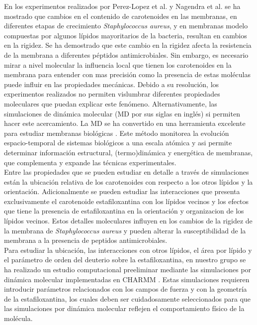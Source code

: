 En los experimentos realizados por Perez-Lopez et al. \cite{Perez-Lopez2019VariationsProperties} y Nagendra et al.  \cite{Nagendra2011} se ha mostrado que cambios en el contenido de carotenoides en las membranas, en diferentes etapas de crecimiento \textit{Staphylococcus aureus}, y en membranas modelo compuestas por algunos l\'{i}pidos mayoritarios de la bacteria, resultan en cambios en la rigidez. Se ha demostrado que este cambio en la rigidez afecta la resistencia de la membrana a diferentes p\'{e}ptidos antimicrobiales. Sin embargo, es necesario mirar a nivel molecular la influencia local que tienen los carotenoides en la membrana para entender con mas precisi\'{o}n como la presencia de estas mol\'{e}culas puede influir en las propiedades mec\'{a}nicas. Debido a su resoluci\'{o}n, los experimentos realizados no permiten vislumbrar diferentes propiedades moleculares que puedan explicar este fen\'{o}meno. Alternativamente, las simulaciones de din\'{a}mica molecular (MD por sus siglas en ingl\'{e}s) si permiten hacer este acercamiento. La MD se ha convertido en una herramienta excelente para estudiar membranas biol\'{o}gicas \cite{Marrink2019ComputationalMembranes}. Este m\'{e}todo monitorea la evoluci\'{o}n espacio-temporal de sistemas biol\'{o}gicos a una escala at\'{o}mica y asi permite determinar informaci\'{o}n estructural, (termo)din\'{a}mica y energ\'{e}tica de membranas, que complementa y expande las t\'{e}cnicas experimentales. \\

Entre las propiedades que se pueden estudiar en detalle a trav\'{e}s de simulaciones est\'{a}n la ubicaci\'{o}n relativa de los carotenoides con respecto a los otros l\'{i}pidos y la orientaci\'{o}n. Adicionalmente se pueden estudiar las interacciones que presenta exclusivamente el carotenoide estafiloxantina con los l\'{i}pidos vecinos y los efectos que tiene la presencia de estafiloxantina en la orientaci\'{o}n y organizacion de los l\'{i}pidos vecinos. Estos detalles moleculares influyen en los cambios de la rigidez de la membrana de \textit{Staphylococcus aureus} y pueden alterar la susceptibilidad de la membrana a la presencia de peptidos antimicrobiales.\\

Para estudiar la ubicaci\'{o}n, las interacciones con otros l\'{i}pidos, el \'{a}rea por l\'{i}pido y el par\'{a}metro de orden del deuterio  sobre la estafiloxantina, en nuestro grupo se ha realizado un estudio computacional preeliminar mediante las simulaciones por din\'{a}mica molecular  implementadas en CHARMM \cite{Melendez-Delgado2018StudyingBilayers}. Estas simulaciones requieren introducir par\'{a}metros relacionados con los campos de fuerza y con la geometr\'{i}a de la estafiloxantina, los cuales deben ser cuidadosamente seleccionados para que las simulaciones por din\'{a}mica molecular reflejen el comportamiento f\'{i}sico de la mol\'{e}cula.\\

